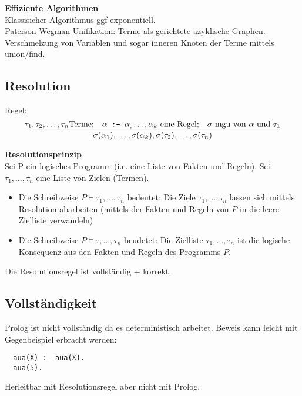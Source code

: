 \textbf{Effiziente Algorithmen}\\
Klassisicher Algorithmus ggf exponentiell.\\
Paterson-Wegman-Unifikation: Terme als gerichtete azyklische Graphen.
Verschmelzung von Variablen und sogar inneren Knoten der Terme mittels union/find.

\subsection{Resolution}%
\label{lp:sub:resolution}
Regel:
\[\frac{\tau_1, \tau_2, \ldots, \tau_n \text{Terme;}\quad \alpha \texttt{ :- } \alpha_, \ldots, \alpha_k \text{ eine Regel;}\quad \sigma \text{ mgu von } \alpha \text{ und } \tau_1}
  {\sigma(\alpha_1), \ldots, \sigma(\alpha_k), \sigma(\tau_2), \ldots, \sigma(\tau_n)}\]

\textbf{Resolutionsprinzip}\\
Sei P ein logisches Programm (i.e. eine Liste von Fakten und Regeln). Sei \(\tau_1, \ldots, \tau_n\) eine Liste von
Zielen (Termen).
\begin{itemize}
  \item Die Schreibweise \( P \vdash \tau_1, \ldots, \tau_n\) bedeutet: Die Ziele \(\tau_1, \ldots, \tau_n\) lassen sich
  mittels Resolution abarbeiten (mittels der Fakten und Regeln von \(P\) in die leere Zielliste verwandeln)
\item Die Schreibweise \( P \vDash \tau, \ldots, \tau_n \) beudetet: Die Zielliste \(\tau_1, \ldots, \tau_n\) ist die
  logische Konsequenz aus den Fakten und Regeln des Programms \(P\).
\end{itemize}
Die Resolutionsregel ist vollständig + korrekt.

\subsection{Vollständigkeit}%
\label{lp:sub:vollstaendigkeit}
Prolog ist nicht vollständig da es deterministisch arbeitet. Beweis kann leicht mit Gegenbeispiel erbracht werden:
\begin{lstlisting}
  aua(X) :- aua(X).
  aua(5).
\end{lstlisting}
Herleitbar mit Resolutionsregel aber nicht mit Prolog.